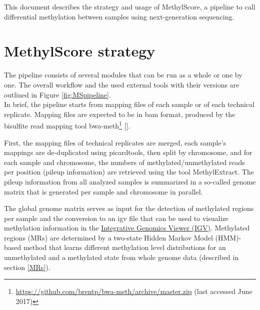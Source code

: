 \documentclass{article}
\begin{document}


\newpage

\tableofcontents

\newpage


This document describes the strategy and usage of MethylScore, a pipeline to call differential methylation between samples using next-generation sequencing. 

\section{MethylScore strategy}

The pipeline consists of several modules that can be run as a whole or one by one. The overall workflow and the used external tools with their versions are outlined in Figure \ref{fig:MSpipeline}.\\

In brief, the pipeline starts from mapping files of each sample or of each technical replicate. Mapping files are expected to be in bam format, produced by the bisulfite read mapping tool bwa-meth\footnote{\href{https://github.com/brentp/bwa-meth/archive/master.zip}{https://github.com/brentp/bwa-meth/archive/master.zip} (last accessed June 2017)} [\cite{bwa_meth}]. 

First, the mapping files of technical replicates are merged, each sample's mappings are de-duplicated using picardtools, then split by chromosome, and for each sample and chromosome, the numbers of methylated/unmethylated reads per position (pileup information) are retrieved using the tool MethylExtract.
The pileup information from all analyzed samples is summarized in a so-called genome matrix that is generated per sample and chromosome in parallel.

The global genome matrix serves as input for the detection of methylated regions per sample and the conversion to an igv file that can be used to visualize methylation information in the  \href{http://software.broadinstitute.org/software/igv/}{Integrative Genomics Viewer (IGV)}. Methylated regions (MRs) are determined by a two-state Hidden Markov Model (HMM)-based method that learns different methylation level distributions for an unmethylated and a methylated state from whole genome data (described in section \ref{MRs}).
\end{document}
